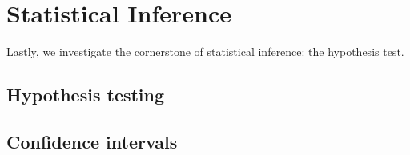 \documentclass[12pt]{article}  \usepackage{algorithm2e} \usepackage{amsmath} \usepackage{amsthm} \usepackage{amsfonts} \usepackage{bbm} \usepackage{color,soul} \usepackage{framed} \usepackage[margin=0.5in]{geometry} \usepackage{hyperref} \usepackage{mathtools} \usepackage[dvipsnames]{xcolor}
\begin{document}








\section{Statistical Inference}
Lastly, we investigate the cornerstone of statistical inference: the hypothesis test. \subsection{Hypothesis testing} \subsection{Confidence intervals}
\end{document}
